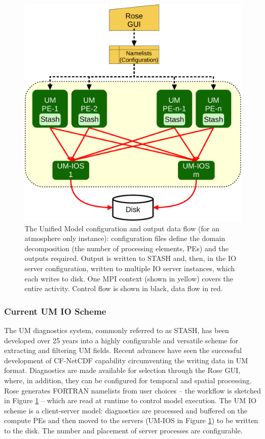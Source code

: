\documentclass[twocolumn, 12pt]{paper}
\begin{document}
\begin{figure}[H]
	\includegraphics[width=\columnwidth]{figures/xios_figures_c.pdf}
	\caption{The Unified Model configuration and output data flow (for an atmosphere only instance): configuration files define the domain decomposition (the number of processing elements, PEs) and the outputs required. Output is written to STASH and, then, in the IO server configuration, written to multiple IO server instances, which each writes to disk. One MPI context (shown in yellow) covers the entire activity. Control flow is shown in black, data flow in red.
	}
	\label{uma-fig}
\end{figure}

\subsubsection{Current UM IO Scheme}

The UM diagnostics system, commonly referred to as STASH, has been developed over 25 years into a highly configurable and versatile scheme for extracting and filtering UM fields.
Recent advances have seen the successful development of CF-NetCDF capability circumventing the writing data in UM format.
Diagnostics are made available for selection through the Rose GUI, where, in addition, they can be configured for temporal and spatial processing.
Rose generates FORTRAN namelists from user choices -- the workflow is sketched in Figure \ref{uma-fig} -- which are read at runtime to control model execution.
The UM IO scheme is a client-server model: diagnostics are processed and buffered on the compute PEs and then moved to the servers (UM-IOS in Figure \ref{uma-fig}) to be written to the disk.
The number and placement of server processes are configurable.
\end{document}

